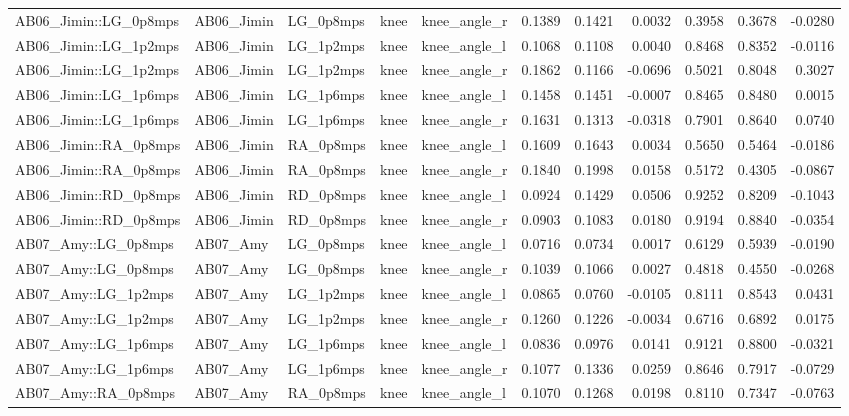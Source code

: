 \begin{table}
\begin{tabular}{lllllrrrrrr}
AB06_Jimin::LG_0p8mps & AB06_Jimin & LG_0p8mps & knee & knee_angle_r & 0.1389 & 0.1421 & 0.0032 & 0.3958 & 0.3678 & -0.0280 \\
AB06_Jimin::LG_1p2mps & AB06_Jimin & LG_1p2mps & knee & knee_angle_l & 0.1068 & 0.1108 & 0.0040 & 0.8468 & 0.8352 & -0.0116 \\
AB06_Jimin::LG_1p2mps & AB06_Jimin & LG_1p2mps & knee & knee_angle_r & 0.1862 & 0.1166 & -0.0696 & 0.5021 & 0.8048 & 0.3027 \\
AB06_Jimin::LG_1p6mps & AB06_Jimin & LG_1p6mps & knee & knee_angle_l & 0.1458 & 0.1451 & -0.0007 & 0.8465 & 0.8480 & 0.0015 \\
AB06_Jimin::LG_1p6mps & AB06_Jimin & LG_1p6mps & knee & knee_angle_r & 0.1631 & 0.1313 & -0.0318 & 0.7901 & 0.8640 & 0.0740 \\
AB06_Jimin::RA_0p8mps & AB06_Jimin & RA_0p8mps & knee & knee_angle_l & 0.1609 & 0.1643 & 0.0034 & 0.5650 & 0.5464 & -0.0186 \\
AB06_Jimin::RA_0p8mps & AB06_Jimin & RA_0p8mps & knee & knee_angle_r & 0.1840 & 0.1998 & 0.0158 & 0.5172 & 0.4305 & -0.0867 \\
AB06_Jimin::RD_0p8mps & AB06_Jimin & RD_0p8mps & knee & knee_angle_l & 0.0924 & 0.1429 & 0.0506 & 0.9252 & 0.8209 & -0.1043 \\
AB06_Jimin::RD_0p8mps & AB06_Jimin & RD_0p8mps & knee & knee_angle_r & 0.0903 & 0.1083 & 0.0180 & 0.9194 & 0.8840 & -0.0354 \\
AB07_Amy::LG_0p8mps & AB07_Amy & LG_0p8mps & knee & knee_angle_l & 0.0716 & 0.0734 & 0.0017 & 0.6129 & 0.5939 & -0.0190 \\
AB07_Amy::LG_0p8mps & AB07_Amy & LG_0p8mps & knee & knee_angle_r & 0.1039 & 0.1066 & 0.0027 & 0.4818 & 0.4550 & -0.0268 \\
AB07_Amy::LG_1p2mps & AB07_Amy & LG_1p2mps & knee & knee_angle_l & 0.0865 & 0.0760 & -0.0105 & 0.8111 & 0.8543 & 0.0431 \\
AB07_Amy::LG_1p2mps & AB07_Amy & LG_1p2mps & knee & knee_angle_r & 0.1260 & 0.1226 & -0.0034 & 0.6716 & 0.6892 & 0.0175 \\
AB07_Amy::LG_1p6mps & AB07_Amy & LG_1p6mps & knee & knee_angle_l & 0.0836 & 0.0976 & 0.0141 & 0.9121 & 0.8800 & -0.0321 \\
AB07_Amy::LG_1p6mps & AB07_Amy & LG_1p6mps & knee & knee_angle_r & 0.1077 & 0.1336 & 0.0259 & 0.8646 & 0.7917 & -0.0729 \\
AB07_Amy::RA_0p8mps & AB07_Amy & RA_0p8mps & knee & knee_angle_l & 0.1070 & 0.1268 & 0.0198 & 0.8110 & 0.7347 & -0.0763 \\

\end{tabular}
\end{table}
